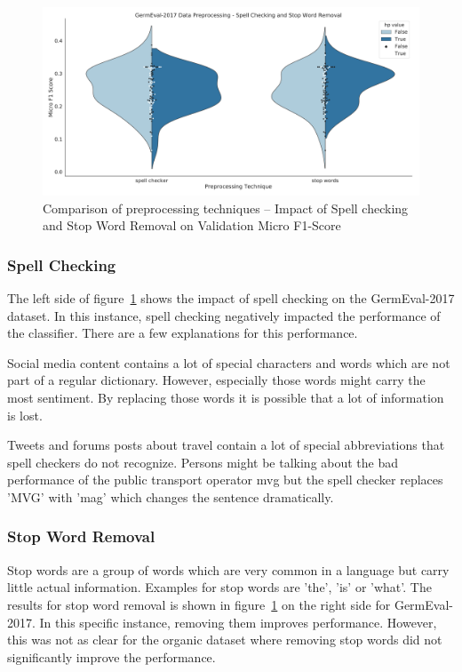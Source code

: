 \begin{figure}
	\centering
	\includegraphics[width=\textwidth]{figures/06_results/06_hp_ge_vio_data}
	\caption{Comparison of preprocessing techniques -- Impact of Spell checking and Stop Word Removal on Validation Micro F1-Score}
	\label{fig:06_PreprocessingHp}
\end{figure}

\subsubsection{Spell Checking}

The left side of figure~\ref{fig:06_PreprocessingHp} shows the impact of spell checking on the GermEval-2017 dataset. In this instance, spell checking negatively impacted the performance of the classifier. There are a few explanations for this performance.
\medskip

Social media content contains a lot of special characters and words which are not part of a regular dictionary. However, especially those words might carry the most sentiment. By replacing those words it is possible that a lot of information is lost.
\medskip

Tweets and forums posts about travel contain a lot of special abbreviations that spell checkers do not recognize. Persons might be talking about the bad performance of the public transport operator \gls{mvg} but the spell checker replaces 'MVG' with 'mag' which changes the sentence dramatically.

\subsubsection{Stop Word Removal}

Stop words are a group of words which are very common in a language but carry little actual information. Examples for stop words are 'the', 'is' or 'what'. The results for stop word removal is shown in figure~\ref{fig:06_PreprocessingHp} on the right side for GermEval-2017. In this specific instance, removing them improves performance. However, this was not as clear for the organic dataset where removing stop words did not significantly improve the performance.

